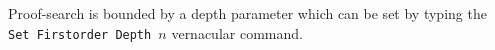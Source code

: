 Proof-search is bounded by a depth parameter which can be set by typing the
{\nobreak \tt Set Firstorder Depth $n$}  
vernacular command.











